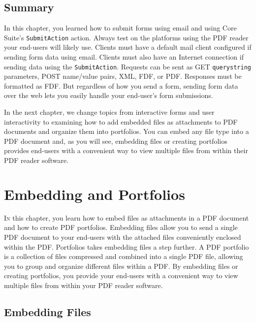 \documentclass[american]{tufte-book}
\numberwithin{equation}{section}
\numberwithin{figure}{section}
\def\color#1{}%
\begin{document}
{{\begin{figure}
\end{figure}


\section{Summary}

In this chapter, you learned how to submit forms using email and using
Core Suite's \texttt{SubmitAction} action. Always test on the platforms
using the PDF reader your end-users will likely use. Clients must
have a default mail client configured if sending form data using email.
Clients must also have an Internet connection if sending data using
the \texttt{SubmitAction}. Requests can be sent as GET \texttt{querystring}
parameters, POST name/value pairs, XML, FDF, or PDF. Responses must
be formatted as FDF. But regardless of how you send a form, sending
form data over the web lets you easily handle your end-user's form
submissions.

In the next chapter, we change topics from interactive forms and user
interactivity to examining how to add embedded files as attachments
to PDF documents and organize them into portfolios. You can embed
any file type into a PDF document and, as you will see, embedding
files or creating portfolios provides end-users with a convenient
way to view multiple files from within their PDF reader software.

\color{white}
\chapter{Embedding and Portfolios}\label{chap:Embedding-Files-and}
\color{black}
\BgThispage
\vspace{8.0em}
\lettrine[lines=2,lhang=0.1]{I}{n} this chapter, you learn how to embed files as attachments in a
PDF document and how to create PDF portfolios. Embedding files allow
you to send a single PDF document to your end-users with the attached
files conveniently enclosed within the PDF. Portfolios takes embedding
files a step further. A PDF portfolio is a collection of files compressed
and combined into a single PDF file, allowing you to group and organize
different files within a PDF. By embedding files or creating portfolios,
you provide your end-users with a convenient way to view multiple
files from within your PDF reader software. 

\section{Embedding Files}

}}
\end{document}
